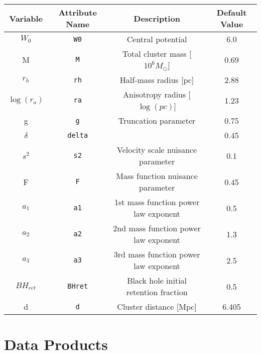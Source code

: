 \documentclass[12pt]{article}
\begin{document}
\begin{center}
\begin{tabular}{ | c | c | c | c | }
    \hline
    Variable & Attribute Name & Description & Default Value \\
    \hline\hline
    \(W_0\) & \texttt{W0} & Central potential & 6.0 \\
    \hline
    M & \texttt{M} & Total cluster mass [\(10^6 M_{\odot}\)] & 0.69 \\
    \hline
    \(r_h\) & \texttt{rh} & Half-mass radius [pc] & 2.88 \\
    \hline
    \(\log(r_a)\) & \texttt{ra} & Anisotropy radius [\(\log(pc)\)] & 1.23 \\
    \hline
    g & \texttt{g} & Truncation parameter & 0.75 \\
    \hline
    \(\delta\) & \texttt{delta} & & 0.45 \\
    \hline
    \(s^2\) & \texttt{s2} & Velocity scale nuisance parameter & 0.1 \\
    \hline
    F & \texttt{F} & Mass function nuisance parameter & 0.45 \\
    \hline
    \(a_1\) & \texttt{a1} & 1st mass function power law exponent & 0.5 \\
    \hline
    \(a_2\) & \texttt{a2} & 2nd mass function power law exponent & 1.3 \\
    \hline
    \(a_3\) & \texttt{a3} & 3rd mass function power law exponent & 2.5 \\
    \hline
    \(BH_{ret}\)&\texttt{BHret} & Black hole initial retention fraction & 0.5 \\
    \hline
    d & \texttt{d} & Cluster distance [Mpc] & 6.405 \\
    \hline
\end{tabular}
\end{center}


\section{Data Products}











\end{document}
